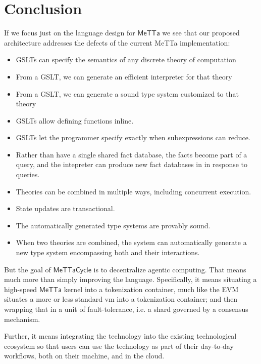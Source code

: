 \documentclass{article}
\newcommand{\MC}{\mathsf{MeTTaCycle}}
\begin{document}
\section{Conclusion}

If we focus just on the language design for $\mathsf{MeTTa}$ we see
that our proposed architecture addresses the defects of the current
MeTTa implementation:

\begin{itemize}
    \item GSLTs can specify the semantics of any discrete theory of computation
    \item From a GSLT, we can generate an efficient interpreter for that theory
    \item From a GSLT, we can generate a sound type system customized to that theory
    \item GSLTs allow defining functions inline.
    \item GSLTs let the programmer specify exactly when subexpressions can reduce.
    \item Rather than have a single shared fact database, the facts become part of a query, and the intepreter can produce new fact databases in in response to queries.
    \item Theories can be combined in multiple ways, including concurrent execution.
    \item State updates are transactional.
    \item The automatically generated type systems are provably sound.
    \item When two theories are combined, the system can automatically generate a new type system encompassing both and their interactions.
\end{itemize}

But the goal of $\MC$ is to decentralize agentic computing. That means
much more than simply improving the language. Specifically, it means
situating a high-speed $\mathsf{MeTTa}$ kernel into a tokenization
container, much like the EVM situates a more or less standard vm into
a tokenization container; and then wrapping that in a unit of
fault-tolerance, i.e. a shard governed by a consensus mechanism.

Further, it means integrating the technology into the existing
technological ecosystem so that users can use the technology as part
of their day-to-day workflows, both on their machine, and in the
cloud.
\end{document}
